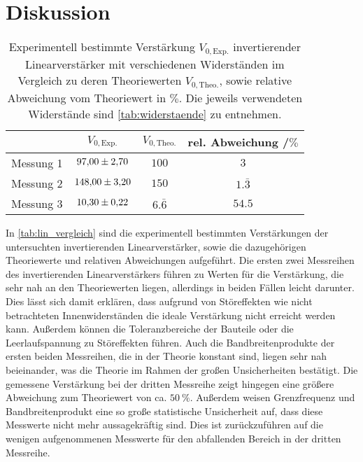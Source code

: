\newpage
\section{Diskussion}

\begin{table}[tb]
  \centering
  \caption{Experimentell bestimmte Verstärkung $V_{0,\mathrm{Exp.}}$ invertierender Linearverstärker mit verschiedenen Widerständen im Vergleich zu deren Theoriewerten $V_{0,\mathrm{Theo.}}$, sowie relative Abweichung vom Theoriewert in $\%$. Die jeweils verwendeten Widerstände sind \autoref{tab:widerstaende} zu entnehmen.}
  \label{tab:lin_vergleich}
  \begin{tabular}{l c c c}
    \toprule
    & $V_{0,\mathrm{Exp.}}$ & $V_{0,\mathrm{Theo.}}$ & rel. Abweichung /$\%$ \\
    \midrule
    Messung 1 & $\num{97.00 \pm 2.70}$ & $\num{100}$ & $\num{3}$\\
    Messung 2 & $\num{148.00 \pm 3.20}$ & $\num{150}$ & $1.\bar{3}$\\
    Messung 3 & $\num{10.30 \pm 0.22}$ & $6.\bar{6}$ & $\num{54.5}$\\
    \bottomrule
  \end{tabular}
\end{table}

In \autoref{tab:lin_vergleich} sind die experimentell bestimmten Verstärkungen der untersuchten invertierenden Linearverstärker, sowie die dazugehörigen Theoriewerte und relativen Abweichungen aufgeführt. Die ersten zwei Messreihen des invertierenden Linearverstärkers führen zu Werten für die Verstärkung, die sehr nah an den Theoriewerten liegen, allerdings in beiden Fällen leicht darunter. Dies lässt sich damit erklären, dass aufgrund von Störeffekten wie nicht betrachteten Innenwiderständen die ideale Verstärkung nicht erreicht werden kann. Außerdem können die Toleranzbereiche der Bauteile oder die Leerlaufspannung zu Störeffekten führen. Auch die Bandbreitenprodukte der ersten beiden Messreihen, die in der Theorie konstant sind, liegen sehr nah beieinander, was die Theorie im Rahmen der großen Unsicherheiten bestätigt. Die gemessene Verstärkung bei der dritten Messreihe zeigt hingegen eine größere Abweichung zum Theoriewert von ca. $\SI{50}{\percent}$. Außerdem weisen Grenzfrequenz und Bandbreitenprodukt eine so große statistische Unsicherheit auf, dass diese Messwerte nicht mehr aussagekräftig sind. Dies ist zurückzuführen auf die wenigen aufgenommenen Messwerte für den abfallenden Bereich in der dritten Messreihe.\\


